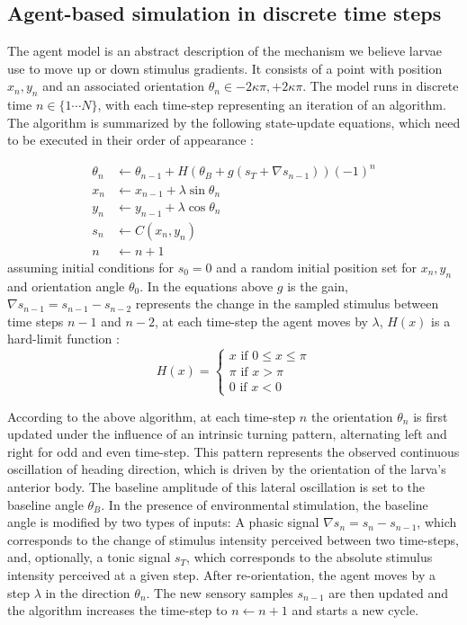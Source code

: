\documentclass[11pt,a4paper]{article}
\begin{document}
\subsection{Agent-based simulation in discrete time steps}
\label{sec:methodsDiscreteAgent}
The agent model is an abstract description of the mechanism we believe larvae use to move up or down stimulus gradients. 
It consists of a point with position $x_n,y_n$ and an associated orientation $\theta_n \in {-2 \kappa \pi,+2 \kappa \pi}$. The model runs in discrete time $n \in \{1 \cdots N\}$, with each time-step representing an iteration of an algorithm.
The algorithm is summarized by the following state-update equations, which need to be executed in their order of appearance :

\begin{align}
\theta_{n} &\leftarrow \theta_{n-1} + H(\theta_B + g (s_{T} + \nabla s_{n-1})){(-1)}^n\\
x_n & \leftarrow x_{n-1}+ \lambda \sin \theta_{n} \\
y_n &\leftarrow y_{n-1}+ \lambda  \cos \theta_{n}\\
s_n &\leftarrow C(x_n,y_n)\\
n &\leftarrow n+1
\label{eqn:Discretemodel}
\end{align}
assuming initial conditions for $s_0 = 0$ and a random initial position set for $x_n,y_n$ and orientation angle $\theta_0$.
In the equations above $g$ is the gain, $\nabla s_{n-1}  = s_{n-1} - s_{n-2}$ represents the change in the sampled stimulus between time steps $n-1$ and $n-2$,  at each time-step the agent moves by $\lambda$,  $H(x)$ is a hard-limit function :
\begin{equation}
H(x) =
\begin{cases}
x \mbox{ if } 0 \leq x \leq \pi \\
\pi \mbox{ if } x > \pi  \\
0 \mbox{ if } x < 0 
\end{cases}
\label{eq:boundary}
\end{equation}

According to the above algorithm, at each time-step $n$ the orientation $\theta_n$ is first updated under the influence of an intrinsic  turning pattern, alternating left and right for odd and even time-step. 
This pattern represents the observed continuous oscillation of heading direction, which is driven by the orientation of the larva's anterior body.
 The baseline amplitude of this lateral oscillation is set to the baseline angle $\theta_B$.
  In the presence of environmental stimulation, the baseline angle is modified by two types of inputs: A phasic signal $\nabla s_{n}  = s_{n} - s_{n-1}$, which corresponds to the change of stimulus intensity perceived between two time-steps, and, optionally, a tonic signal $s_{T}$, which corresponds to the absolute stimulus intensity perceived at a given step.
After re-orientation, the agent moves by a step $\lambda$ in the direction $\theta_n$. The new sensory samples $s_{n-1}$ are then updated and the algorithm increases the time-step to $n  \leftarrow n+1$ and starts a new cycle.
\end{document}
